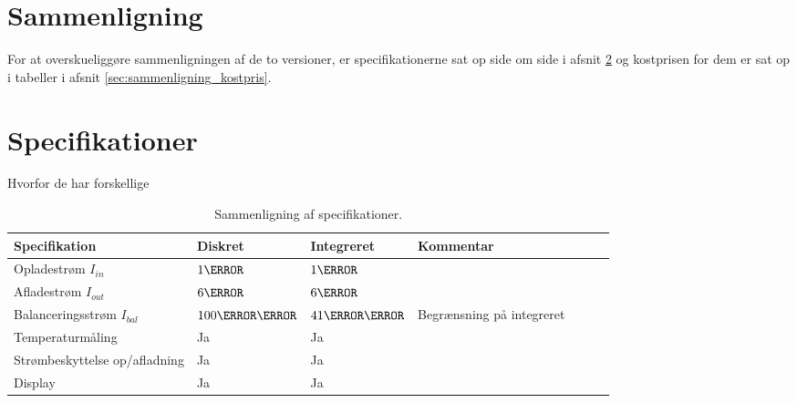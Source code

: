 \section{Sammenligning} \label{afs:sammenligning}
For at overskueliggøre sammenligningen af de to versioner, er specifikationerne sat op side om side i afsnit \ref{sec:sammenligning_specifikation} og kostprisen for dem er sat op i tabeller i afsnit \ref{sec:sammenligning_kostpris}.

\section{Specifikationer} \label{sec:sammenligning_specifikation}
Hvorfor de har forskellige
\begin{table}[h!]
	\small
	\centering
	\begin{threeparttable}
		\begin{tabular}{ l l l l l l l }
			\toprule
			\multicolumn{1}{l}{\textbf{Specifikation}}          &
			\multicolumn{1}{l}{\textbf{Diskret}}           &
			\multicolumn{1}{l}{\textbf{Integreret}}  &
			\multicolumn{1}{l}{\textbf{Kommentar}}   \\ 
			\hline
			Opladestrøm $I_{in}$           &  $1\ampere$            & $1\ampere$            &    \\
			Afladestrøm $I_{out}$          &   $6\ampere$           & $6\ampere$            &    \\
			Balanceringsstrøm $I_{bal}$    & $100\milli\ampere$     & $41\milli\ampere$     &  Begrænsning på integreret  \\
			Temperaturmåling               &   Ja                   &  Ja                   &    \\
			Strømbeskyttelse op/afladning  &   Ja                   &  Ja                   &    \\
			Display                        &   Ja                   &  Ja                   &    \\

			\bottomrule
		\end{tabular}
		\caption{Sammenligning af specifikationer.}
		\label{tab:specifikationer}
	\end{threeparttable}
\end{table} 
\FloatBlock




